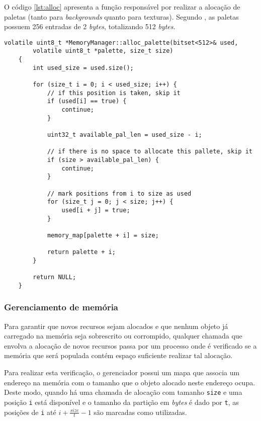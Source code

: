     O código \ref{lst:alloc} apresenta a função responsável por realizar a alocação de paletas (tanto para \textit{backgrounds} quanto para texturas). Segundo , as paletas possuem 256 entradas de 2 \textit{bytes}, totalizando 512 \textit{bytes}.

    \begin{lstlisting}[float,caption={Código de alocação de paletas para \textit{backgrounds} e texturas.},label={lst:alloc}]
    volatile uint8_t *MemoryManager::alloc_palette(bitset<512>& used,
        volatile uint8_t *palette, size_t size)
    {
        int used_size = used.size();

        for (size_t i = 0; i < used_size; i++) {
            // if this position is taken, skip it
            if (used[i] == true) {
                continue;
            }

            uint32_t available_pal_len = used_size - i;

            // if there is no space to allocate this pallete, skip it
            if (size > available_pal_len) {
                continue;
            }

            // mark positions from i to size as used
            for (size_t j = 0; j < size; j++) {
                used[i + j] = true;
            }

            memory_map[palette + i] = size;

            return palette + i;
        }

        return NULL;
    }
    \end{lstlisting}


    \subsubsection{Gerenciamento de memória}

    Para garantir que novos recursos sejam alocados e que nenhum objeto já carregado na memória seja sobrescrito ou corrompido, qualquer chamada que envolva a alocação de novos recursos passa por um processo onde é verificado se a memória que será populada contém espaço suficiente realizar tal alocação.

    Para realizar esta verificação, o gerenciador possui um mapa que associa um endereço na memória com o tamanho que o objeto alocado neste endereço ocupa. Deste modo, quando há uma chamada de alocação com tamanho \texttt{size} e uma posição \texttt{i} está disponível e o tamanho da partição em \textit{bytes} é dado por \texttt{t}, as posições de \texttt{i} até $ i + \frac{size}{t} - 1 $ são marcadas como utilizadas.

